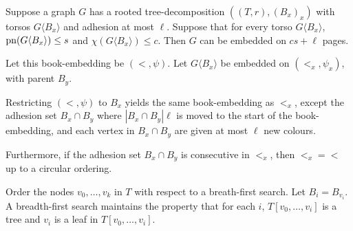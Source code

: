 \begin{theorem}
	Suppose a graph \(G\) has a rooted tree-decomposition \(((T,r), (B_x)_x)\) with torsos \(G \langle B_x \rangle\) and adhesion at most \(\ell\). Suppose that for every torso $G\langle B_x \rangle$, \(\operatorname{pn}(G\langle B_x \rangle) \leq s\) and \(\chi(G\langle B_x \rangle) \leq c\). Then \(G\) can be embedded on \(cs + \ell\) pages.

	Let this book-embedding be $(<, \psi)$. Let $G\langle B_x \rangle$ be embedded on $(<_x, \psi_x)$, with parent $B_y$. 
	
	Restricting $(<, \psi)$ to $B_x$ yields the same book-embedding as $<_x$, except the adhesion set $B_x \cap B_y$ where $|B_x \cap B_y|\ell$ is moved to the start of the book-embedding, and each vertex in $B_x \cap B_y$ are given at most $\ell$ new colours. 
	
	Furthermore, if the adhesion set $B_x \cap B_y$ is consecutive in $<_x$, then $<_x = <$ up to a circular ordering.
\end{theorem}
Order the nodes \(v_0, \ldots, v_k\) in $T$ with respect to a breath-first search. Let $B_i = B_{v_i}$. 
A breadth-first search maintains the property that for each \(i\), \(T[v_0, \ldots, v_{i}]\) is a tree and \(v_i\) is a leaf in \(T[v_0, \ldots, v_{i}]\).
